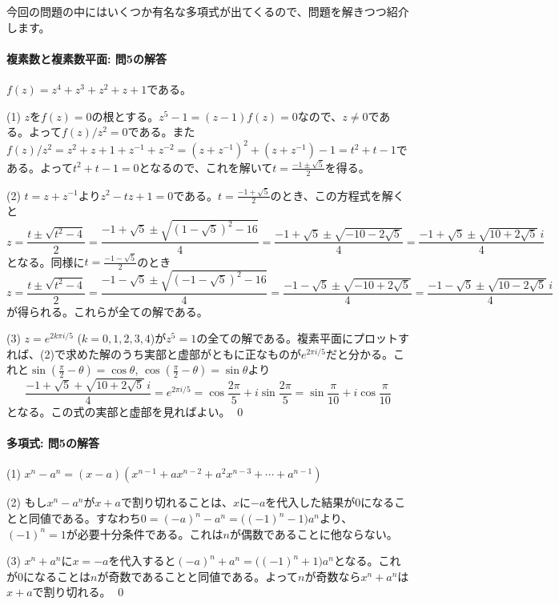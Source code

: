今回の問題の中にはいくつか有名な多項式が出てくるので、問題を解きつつ紹介します。

\paragraph{複素数と複素数平面: 問5の解答} $f(z)=z^4+z^3+z^2+z+1$である。

\noindent (1) $z$を$f(z)=0$の根とする。$z^5-1=(z-1)f(z)=0$なので、$z\neq 0$である。よって$f(z)/z^2=0$である。また$f(z)/z^2=z^2+z+1+z^{-1}+z^{-2} = (z+z^{-1})^2 + (z+z^{-1}) - 1 = t^2+t-1$である。よって$t^2+t-1=0$となるので、これを解いて$t=\frac{-1\pm\sqrt{5}}{2}$を得る。

\noindent (2) $t=z+z^{-1}$より$z^2-tz+1=0$である。$t=\frac{-1+\sqrt{5}}{2}$のとき、この方程式を解くと
\[
z = \frac{t\pm\sqrt{t^2-4}}{2} = \frac{-1+\sqrt{5}\pm\sqrt{(1-\sqrt{5})^2-16}}{4}
= \frac{-1+\sqrt{5}\pm\sqrt{-10-2\sqrt{5}}}{4}
= \frac{-1+\sqrt{5}\pm\sqrt{10+2\sqrt{5}}\,i}{4}
\]
となる。同様に$t=\frac{-1-\sqrt{5}}{2}$のとき
\[
z = \frac{t\pm\sqrt{t^2-4}}{2} = \frac{-1-\sqrt{5}\pm\sqrt{(-1-\sqrt{5})^2-16}}{4}
= \frac{-1-\sqrt{5}\pm\sqrt{-10+2\sqrt{5}}}{4}
= \frac{-1-\sqrt{5}\pm\sqrt{10-2\sqrt{5}}\,i}{4}
\]
が得られる。これらが全ての解である。

\noindent (3) $z = e^{2k\pi i/5}$ ($k=0,1,2,3,4$)が$z^5=1$の全ての解である。複素平面にプロットすれば、(2)で求めた解のうち実部と虚部がともに正なものが$e^{2\pi i/5}$だと分かる。これと$\sin(\frac{\pi}{2}-\theta) = \cos\theta$, $\cos(\frac{\pi}{2}-\theta) = \sin\theta$より
\[
\frac{-1+\sqrt{5}+\sqrt{10+2\sqrt{5}}\,i}{4} = e^{2\pi i/5}
= \cos\frac{2\pi}{5} + i \sin \frac{2\pi}{5} = \sin\frac{\pi}{10} + i \cos \frac{\pi}{10}
\]
となる。この式の実部と虚部を見ればよい。 \qed

\paragraph{多項式: 問5の解答}
\noindent (1) $x^n-a^n = (x-a)(x^{n-1}+ax^{n-2}+a^2x^{n-3}+\cdots+a^{n-1})$

\noindent (2) もし$x^n-a^n$が$x+a$で割り切れることは、$x$に$-a$を代入した結果が$0$になることと同値である。すなわち$0=(-a)^n-a^n=\bigl((-1)^n-1\bigr)a^n$より、$(-1)^n=1$が必要十分条件である。これは$n$が偶数であることに他ならない。

\noindent (3) $x^n+a^n$に$x=-a$を代入すると$(-a)^n+a^n = \bigl((-1)^n+1\bigr)a^n$となる。これが$0$になることは$n$が奇数であることと同値である。よって$n$が奇数なら$x^n+a^n$は$x+a$で割り切れる。 \qed

